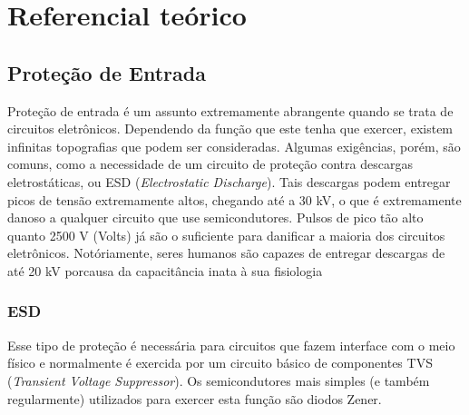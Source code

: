 \chapter{Referencial te\'orico}\label{cap:referencialTeorico}


\section{Proteção de Entrada}\label{sec:InputProtection}

Proteção de entrada é um assunto extremamente abrangente quando se trata de circuitos eletrônicos. Dependendo da função que este tenha que exercer, existem infinitas topografias que podem ser consideradas. Algumas exigências, porém, são comuns, como a necessidade de um circuito de proteção contra descargas eletrostáticas, ou \gls{ESD} (\textit{Electrostatic Discharge}). Tais descargas podem entregar picos de tensão extremamente altos, chegando até a 30 kV, o que é extremamente danoso a qualquer circuito que use semicondutores. Pulsos de pico tão alto quanto 2500 V (Volts) já são o suficiente para danificar a maioria dos circuitos eletrônicos. Notóriamente, seres humanos são capazes de entregar descargas de até 20 kV porcausa da capacitância inata à sua fisiologia %

    \subsection{ESD}\label{subsec:electrostaticDischarge}
    Esse tipo de proteção é necessária para circuitos que fazem interface com o meio físico e normalmente é exercida por um circuito básico de componentes \gls{TVS} (\textit{Transient Voltage Suppressor}). Os semicondutores mais simples (e também regularmente) utilizados para exercer esta função são diodos Zener.
    

